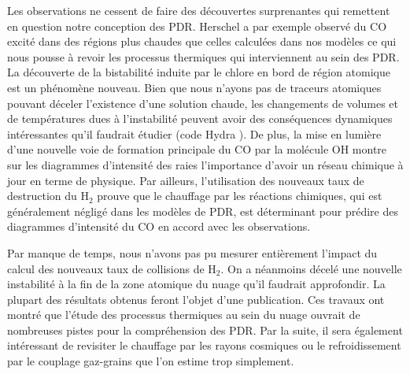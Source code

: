\documentclass[11pt,a4paper,twoside,openright]{article}
\begin{document}
\begin{spacing}{0.98}
Les observations ne cessent de faire des découvertes surprenantes qui remettent en question notre conception des PDR. Herschel a par exemple observé du $\mathrm{CO}$ excité dans des régions plus chaudes que celles calculées dans nos modèles ce qui nous pousse à revoir les processus thermiques qui interviennent au sein des PDR. La découverte de la bistabilité induite par le chlore en bord de région atomique est un phénomène nouveau. Bien que nous n'ayons pas de traceurs atomiques pouvant déceler l'existence d'une solution chaude, les changements de volumes et de températures dues à l'instabilité peuvent avoir des conséquences dynamiques intéressantes qu'il faudrait étudier (code Hydra \cite{Bron2018}). De plus, la mise en lumière d'une nouvelle voie de formation principale du $\mathrm{CO}$ par la molécule $\mathrm{OH}$ montre sur les diagrammes d'intensité des raies l'importance d'avoir un réseau chimique à jour en terme de physique. Par ailleurs, l'utilisation des nouveaux taux de destruction du $\mathrm{H}_2$ prouve que le chauffage par les réactions chimiques, qui est généralement négligé dans les modèles de PDR, est déterminant pour prédire des diagrammes d'intensité du $\mathrm{CO}$ en accord avec les observations. \newline 

Par manque de temps, nous n'avons pas pu mesurer entièrement l'impact du calcul des nouveaux taux de collisions de $\mathrm{H}_2$. On a néanmoins décelé une nouvelle instabilité à la fin de la zone atomique du nuage qu'il faudrait approfondir. La plupart des résultats obtenus feront l'objet d'une publication. Ces travaux ont montré que l'étude des processus thermiques au sein du nuage ouvrait de nombreuses pistes pour la compréhension des PDR. Par la suite, il sera également intéressant de revisiter le chauffage par les rayons cosmiques ou le refroidissement par le couplage gaz-grains que l'on estime trop simplement. 

\clearpage



\clearpage
\setcounter{secnumdepth}{4}





\end{spacing}
\end{document}
